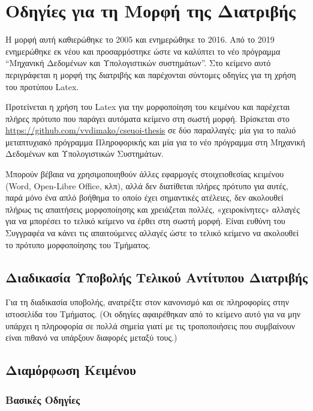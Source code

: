 \chapter{Οδηγίες για τη Μορφή της Διατριβής}
\label{ch:Instructions}

Η μορφή αυτή καθιερώθηκε το 2005 και ενημερώθηκε το 2016. 
Από το 2019 ενημερώθηκε εκ νέου και προσαρμόστηκε ώστε να καλύπτει το νέο 
πρόγραμμα ``Μηχανική Δεδομένων και Υπολογιστικών συστημάτων''.
Στο κείμενο αυτό περιγράφεται η μορφή της διατριβής και παρέχονται σύντομες οδηγίες για τη χρήση του προτύπου Latex.

Προτείνεται η χρήση του Latex για την μορφοποίηση του κειμένου και παρέχεται πλήρες πρότυπο που παράγει αυτόματα κείμενο στη σωστή μορφή.
Βρίσκεται στο \url{https://github.com/vvdimako/cseuoi-thesis} σε δύο παραλλαγές: μία για το παλιό μεταπτυχιακό πρόγραμμα Πληροφορικής και μία για το νέο πρόγραμμα στη Μηχανική Δεδομένων και Υπολογιστικών Συστημάτων.

Μπορούν βέβαια να χρησιμοποιηθούν άλλες εφαρμογές στοιχειοθεσίας κειμένου (Word, Open-Libre Office, κλπ), αλλά δεν διατίθεται πλήρες πρότυπο για αυτές, παρά μόνο ένα απλό βοήθημα το οποίο έχει σημαντικές ατέλειες, δεν ακολουθεί πλήρως τις απαιτήσεις μορφοποίησης και χρειάζεται πολλές, «χειροκίνητες» αλλαγές για να μπορέσει το τελικό κείμενο να έρθει στη σωστή μορφή.
Είναι ευθύνη του Συγγραφέα να κάνει τις απαιτούμενες αλλαγές ώστε το τελικό κείμενο να ακολουθεί το πρότυπο μορφοποίησης του Τμήματος. 


\section{Διαδικασία Υποβολής Τελικού Αντίτυπου Διατριβής}
\label{sec:Submission}
Για τη διαδικασία υποβολής, ανατρέξτε στον κανονισμό και σε πληροφορίες στην 
ιστοσελίδα του Τμήματος.
(Οι οδηγίες αφαιρέθηκαν από το κείμενο αυτό για να μην υπάρχει η πληροφορία 
σε πολλά σημεία γιατί με τις τροποποιήσεις που συμβαίνουν είναι πιθανό να 
υπάρξουν διαφορές μεταξύ τους.)


\section{Διαμόρφωση Κειμένου}
\label{sec:Text}

\subsection{Βασικές Οδηγίες}
\label{subsec:Basic}


